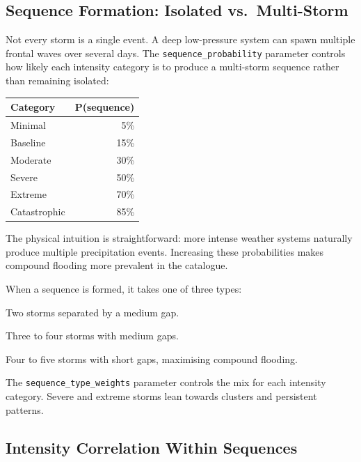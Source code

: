 \documentclass[11pt,a4paper]{article}
\begin{document}
\subsection{Sequence Formation: Isolated vs.\ Multi-Storm}

Not every storm is a single event.  A deep low-pressure system can spawn
multiple frontal waves over several days.  The \texttt{sequence\_probability}
parameter controls how likely each intensity category is to produce a
multi-storm sequence rather than remaining isolated:

\begin{center}
\begin{tabular}{lr}
\toprule
\textbf{Category} & \textbf{P(sequence)} \\
\midrule
Minimal       &  5\% \\
Baseline      & 15\% \\
Moderate      & 30\% \\
Severe        & 50\% \\
Extreme       & 70\% \\
Catastrophic  & 85\% \\
\bottomrule
\end{tabular}
\end{center}

\noindent The physical intuition is straightforward: more intense weather
systems naturally produce multiple precipitation events.  Increasing these
probabilities makes compound flooding more prevalent in the catalogue.

When a sequence is formed, it takes one of three types:

\begin{description}[leftmargin=2em]
  \item[Doublet] Two storms separated by a medium gap.
  \item[Cluster] Three to four storms with medium gaps.
  \item[Persistent] Four to five storms with short gaps, maximising
        compound flooding.
\end{description}

\noindent The \texttt{sequence\_type\_weights} parameter controls the
mix for each intensity category.  Severe and extreme storms lean
towards clusters and persistent patterns.

\subsection{Intensity Correlation Within Sequences}
\end{document}
